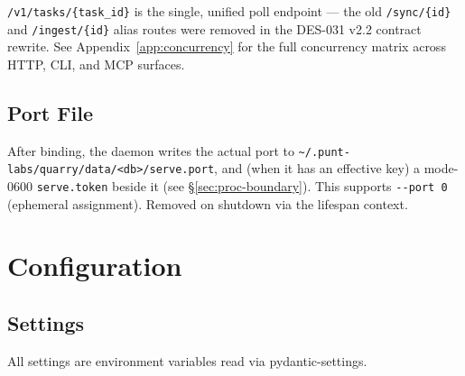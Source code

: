 \documentclass[a4paper,10pt]{article}
\begin{document}
\texttt{/v1/tasks/\{task\_id\}} is the single, unified poll endpoint ---
the old \texttt{/sync/\{id\}} and \texttt{/ingest/\{id\}} alias routes
were removed in the DES-031 v2.2 contract rewrite.  See
Appendix~\ref{app:concurrency} for the full concurrency matrix across
HTTP, CLI, and MCP surfaces.

\subsection{Port File}

After binding, the daemon writes the actual port to
\texttt{\~{}/.punt-labs/quarry/data/<db>/serve.port}, and (when it has an
effective key) a mode-0600 \texttt{serve.token} beside it (see
\S\ref{sec:proc-boundary}).  This supports \texttt{-{}-port 0} (ephemeral
assignment).  Removed on shutdown via the lifespan context.

\section{Configuration}

\subsection{Settings}

All settings are environment variables read via pydantic-settings.
\end{document}
